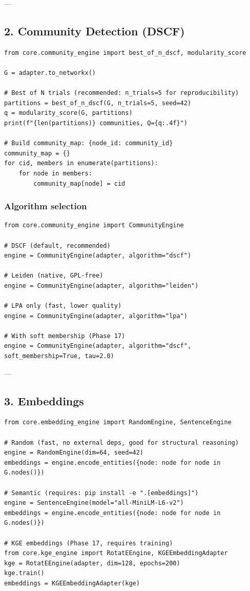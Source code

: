 \documentclass[11pt,article,oneside]{memoir}
\begin{document}
---

\subsection{2. Community Detection (DSCF)}

\begin{lstlisting}
from core.community_engine import best_of_n_dscf, modularity_score

G = adapter.to_networkx()

# Best of N trials (recommended: n_trials=5 for reproducibility)
partitions = best_of_n_dscf(G, n_trials=5, seed=42)
q = modularity_score(G, partitions)
print(f"{len(partitions)} communities, Q={q:.4f}")

# Build community_map: {node_id: community_id}
community_map = {}
for cid, members in enumerate(partitions):
    for node in members:
        community_map[node] = cid
\end{lstlisting}

\subsubsection{Algorithm selection}
\begin{lstlisting}
from core.community_engine import CommunityEngine

# DSCF (default, recommended)
engine = CommunityEngine(adapter, algorithm="dscf")

# Leiden (native, GPL-free)
engine = CommunityEngine(adapter, algorithm="leiden")

# LPA only (fast, lower quality)
engine = CommunityEngine(adapter, algorithm="lpa")

# With soft membership (Phase 17)
engine = CommunityEngine(adapter, algorithm="dscf", soft_membership=True, tau=2.0)
\end{lstlisting}

---

\subsection{3. Embeddings}

\begin{lstlisting}
from core.embedding_engine import RandomEngine, SentenceEngine

# Random (fast, no external deps, good for structural reasoning)
engine = RandomEngine(dim=64, seed=42)
embeddings = engine.encode_entities({node: node for node in G.nodes()})

# Semantic (requires: pip install -e ".[embeddings]")
engine = SentenceEngine(model="all-MiniLM-L6-v2")
embeddings = engine.encode_entities({node: node for node in G.nodes()})

# KGE embeddings (Phase 17, requires training)
from core.kge_engine import RotatEEngine, KGEEmbeddingAdapter
kge = RotatEEngine(adapter, dim=128, epochs=200)
kge.train()
embeddings = KGEEmbeddingAdapter(kge)
\end{lstlisting}
\end{document}
